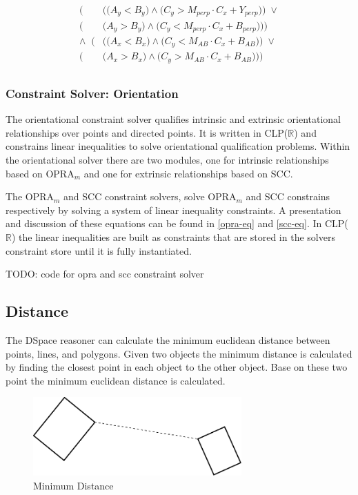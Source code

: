 \documentclass[12pt]{ucthesis}
\begin{document}
\begin{equation}\label{scc-eq}
\begin{aligned}
\Big(&\Big(\Big(A_{y} < B_{y}\Big) \wedge \Big(C_{y} > M_{perp} \cdot C_{x} + Y_{perp}\Big)\Big) \; \lor \\
\Big(&\Big(A_{y} > B_{y}\Big) \wedge \Big(C_{y} < M_{perp} \cdot C_{x} + B_{perp}\Big)\Big)\Big) \\
\wedge \;\; \Big(&\Big(\Big(A_{x} < B_{x}\Big) \wedge \Big(C_{y} < M_{AB} \cdot C_{x} + B_{AB}\Big)\Big) \; \lor \\
\Big(&\Big(A_{x} > B_{x}\Big) \wedge \Big(C_{y} > M_{AB} \cdot C_{x} + B_{AB}\Big)\Big)\Big) \\
\end{aligned}
\end{equation}

\subsubsection{Constraint Solver: Orientation}
The orientational constraint solver qualifies intrinsic and extrinsic orientational relationships over points and directed points. It is written in CLP($\mathbb{R}$) and constrains linear inequalities to solve orientational qualification problems. Within the orientational solver there are two modules, one for intrinsic relationships based on OPRA$_{m}$ and one for extrinsic relationships based on SCC.

The OPRA$_{m}$ and SCC constraint solvers, solve OPRA$_{m}$ and SCC constrains respectively by solving a system of linear inequality constraints. A presentation and discussion of these equations can be found in \ref{opra-eq} and \ref{scc-eq}. In CLP($\mathbb{R}$) the linear inequalities are built as constraints that are stored in the solvers constraint store until it is fully instantiated. 

TODO: code for opra and scc constraint solver

\subsection{Distance}
The DSpace reasoner can calculate the minimum euclidean distance between points, lines, and polygons. Given two objects the minimum distance is calculated by finding the closest point in each object to the other object. Base on these two point the minimum euclidean distance is calculated. 

\begin{figure}[H]
\centering
\includegraphics[width=80mm]{min-dist}
\caption{Minimum Distance}
\label{min-dist}
\end{figure}
\end{document}

